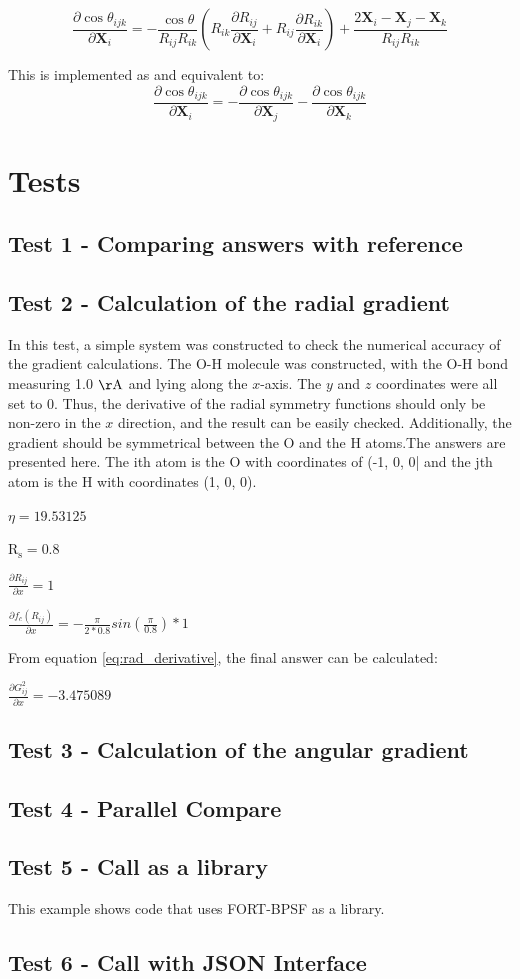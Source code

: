 \documentclass{article}
\newcommand{\mb}[1]{\mathbf{#1}}
\begin{document}
\begin{equation}
\frac{\partial \cos \theta_{ijk} } {\partial \mb{X}_i} = -\frac{\cos{\theta}  }{  R_{ij}  R_{ik} }  
\left( R_{ik} \frac{\partial R_{ij} } {\partial \mb{X}_i} + R_{ij} \frac{\partial R_{ik} } {\partial \mb{X}_i} \right) + \frac{ 2\mb{X}_i - \mb{X}_j - \mb{X}_k} { R_{ij} R_{ik} }
\end{equation}

This is implemented as and equivalent to:
\begin{equation}
\frac{\partial \cos \theta_{ijk} } {\partial \mb{X}_i} = - \frac{\partial \cos \theta_{ijk} } {\partial \mb{X}_j} - \frac{\partial \cos \theta_{ijk} } {\partial \mb{X}_k}
\end{equation}

\section{Tests}
\subsection{Test 1 - Comparing answers with reference}

\subsection{Test 2 - Calculation of the radial gradient}
In this test, a simple system was constructed to check the numerical accuracy of the gradient calculations. The O-H molecule was constructed, with the O-H bond measuring 1.0 $\mathrm{\AA}$ and lying along the $x$-axis. The $y$ and $z$ coordinates were all set to 0. Thus, the derivative of the radial symmetry functions should only be non-zero in the $x$ direction, and the result can be easily checked. Additionally, the gradient should be symmetrical between the O and the H atoms.The answers are presented here. The ith atom is the O with coordinates of (-1, 0, 0| and the jth atom is the H with coordinates (1, 0, 0).


$\eta = 19.53125$

$\mathrm{R_s} = 0.8$

$\frac{\partial R_{ij}}{\partial x} = 1$

$\frac{\partial f_c (R_{ij}) } { \partial x} = - \frac{\pi}{2 * 0.8} sin \left( \frac {\pi}{0.8} \right) * 1 $

From equation \eqref{eq:rad_derivative}, the final answer can be calculated:

$\frac{\partial G^2_{ij}}{\partial x} = -3.475089$

\subsection{Test 3 - Calculation of the angular gradient}

\subsection{Test 4 - Parallel Compare}

\subsection{Test 5 - Call as a library}
This example shows code that uses FORT-BPSF as a library.

\subsection{Test 6 - Call with JSON Interface}
\end{document}
